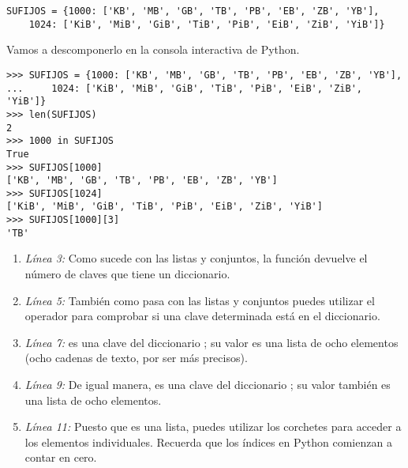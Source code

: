 \noindent\begin{minipage}{\textwidth}
\begin{lstlisting}[mathescape=True]
SUFIJOS = {1000: ['KB', 'MB', 'GB', 'TB', 'PB', 'EB', 'ZB', 'YB'],
    1024: ['KiB', 'MiB', 'GiB', 'TiB', 'PiB', 'EiB', 'ZiB', 'YiB']}
\end{lstlisting}
\end{minipage}

Vamos a descomponerlo en la consola interactiva de Python.

\noindent\begin{minipage}{\textwidth}
\begin{lstlisting}[mathescape=True]
>>> SUFIJOS = {1000: ['KB', 'MB', 'GB', 'TB', 'PB', 'EB', 'ZB', 'YB'],
...     1024: ['KiB', 'MiB', 'GiB', 'TiB', 'PiB', 'EiB', 'ZiB', 'YiB']}
>>> len(SUFIJOS)
2
>>> 1000 in SUFIJOS
True
>>> SUFIJOS[1000]
['KB', 'MB', 'GB', 'TB', 'PB', 'EB', 'ZB', 'YB']
>>> SUFIJOS[1024]
['KiB', 'MiB', 'GiB', 'TiB', 'PiB', 'EiB', 'ZiB', 'YiB']
>>> SUFIJOS[1000][3]
'TB'
\end{lstlisting}
\end{minipage}

\begin{enumerate}

\item \emph{Línea 3:} Como sucede con las listas y conjuntos, la función  devuelve el número de claves que tiene un diccionario.

\item \emph{Línea 5:} También como pasa con las listas y conjuntos puedes utilizar el operador  para comprobar si una clave determinada está en el diccionario.

\item \emph{Línea 7:}  es una clave del diccionario ; su valor es una lista de ocho elementos (ocho cadenas de texto, por ser más precisos).

\item \emph{Línea 9:} De igual manera,  es una clave del diccionario ; su valor también es una lista de ocho elementos.

\item \emph{Línea 11:} Puesto que  es una lista, puedes utilizar los corchetes para acceder a los elementos individuales. Recuerda que los índices en Python comienzan a contar en cero.

\end{enumerate}

